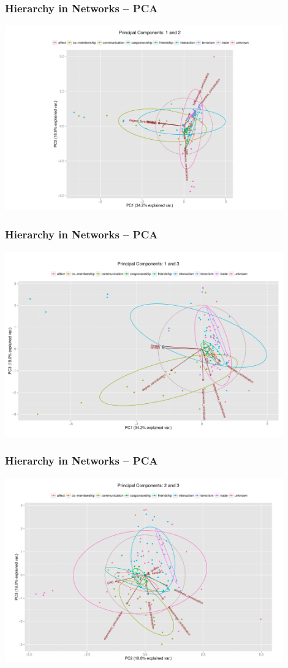 \documentclass[xcolor={table}]{beamer}
\newenvironment{changemargin}[2]{%
  \begin{list}{}{%
    \setlength{\topsep}{0pt}%
    \setlength{\leftmargin}{#1}%
    \setlength{\rightmargin}{#2}%
    \setlength{\listparindent}{\parindent}%
    \setlength{\itemindent}{\parindent}%
    \setlength{\parsep}{\parskip}%
  }%
  \item[]}{\end{list}}
\begin{document}
\begin{frame}\frametitle{Hierarchy in Networks -- PCA}
	\begin{changemargin}{-2cm}{ -2cm}
		\centering
		\includegraphics[width=12cm, height=8cm]{images/Observed_PCA_Components1_2.pdf}
	\end{changemargin}
\end{frame}

\begin{frame}\frametitle{Hierarchy in Networks -- PCA}
	\begin{changemargin}{-2cm}{ -2cm}
		\centering
		\includegraphics[width=12cm, height=8cm]{images/Observed_PCA_Components1_3.pdf}
	\end{changemargin}
\end{frame}

\begin{frame}\frametitle{Hierarchy in Networks -- PCA}
	\begin{changemargin}{-2cm}{ -2cm}
		\centering
		\includegraphics[width=12cm, height=8cm]{images/Observed_PCA_Components2_3.pdf}
	\end{changemargin}
\end{frame}
\end{document}
